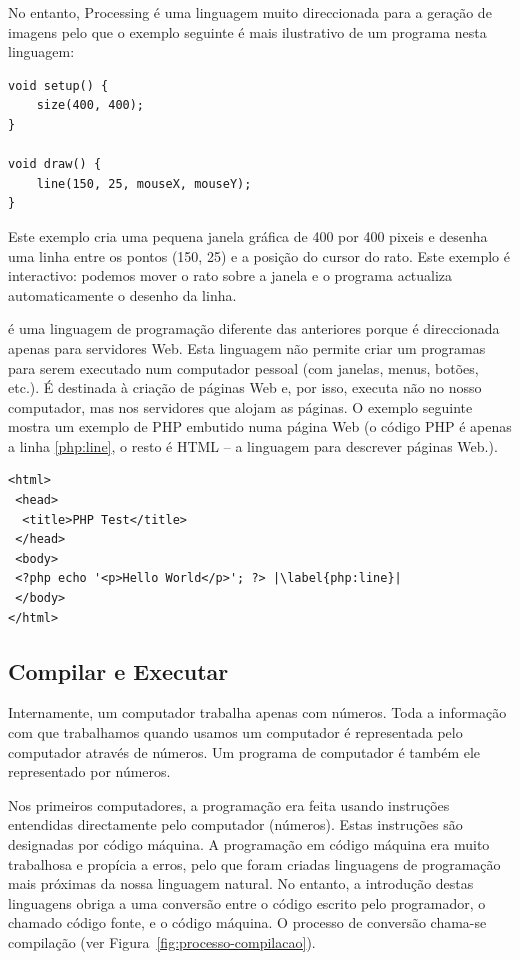 \begin{description}
No entanto, Processing é uma linguagem muito direccionada para a geração de imagens pelo que o exemplo seguinte é mais ilustrativo de um programa nesta linguagem:
\begin{lstlisting}
void setup() {
	size(400, 400);
}
 
void draw() {
	line(150, 25, mouseX, mouseY);
}
\end{lstlisting}
Este exemplo cria uma pequena janela gráfica de 400 por 400 pixeis e desenha uma linha entre os pontos (150, 25) e a posição do cursor do rato. Este exemplo é interactivo: podemos mover o rato sobre a janela e o programa actualiza automaticamente o desenho da linha. 

\item[PHP] é uma linguagem de programação diferente das anteriores porque é direccionada apenas para servidores Web. Esta linguagem não permite criar um programas para serem executado num computador pessoal (com janelas, menus, botões, etc.). É destinada à criação de páginas Web e, por isso, executa não no nosso computador, mas nos servidores que alojam as páginas. O exemplo seguinte mostra um exemplo de PHP embutido numa página Web (o código PHP é apenas a linha \ref{php:line}, o resto é HTML -- a linguagem para descrever páginas Web.).
\begin{lstlisting}[escapechar=|]
<html>
 <head>
  <title>PHP Test</title>
 </head>
 <body>
 <?php echo '<p>Hello World</p>'; ?> |\label{php:line}|
 </body>
</html>
\end{lstlisting}

\end{description}

\subsection{Compilar e Executar}
Internamente, um computador trabalha apenas com números. Toda a informação com que trabalhamos quando usamos um computador é representada pelo computador através de números. Um programa de computador é também ele representado por números. 

Nos primeiros computadores, a programação era feita usando instruções entendidas directamente pelo computador (números). Estas instruções são designadas por código máquina. 
A programação em código máquina era muito trabalhosa e propícia a erros, pelo que foram criadas linguagens de programação  mais próximas da nossa linguagem natural. No entanto, a introdução destas linguagens obriga a uma conversão entre o código escrito pelo programador, o chamado código fonte, e o código máquina. O processo de conversão chama-se compilação (ver Figura~\ref{fig:processo-compilacao}). 


